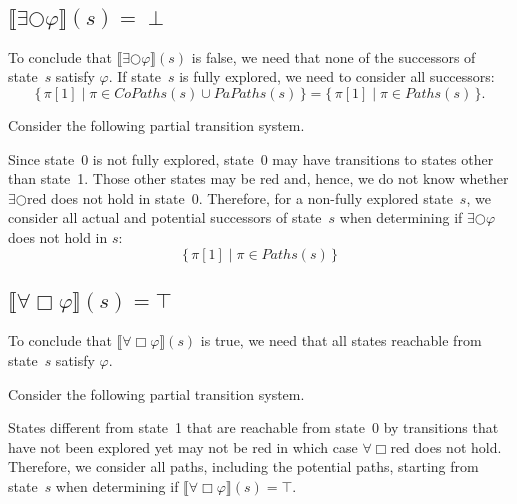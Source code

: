 \documentclass[12pt]{article}
\newcommand{\always}{\Box}
\newcommand{\nxt}{\bigcirc}
\theoremstyle{definition}
\newcommand{\satisfaction}[1]{\llbracket #1 \rrbracket}
\newenvironment{franck}{\color{red}}{\color{black}}
\begin{document}
\begin{franck}
\subsection*{$\satisfaction{\exists \nxt \varphi}(s) = \perp$}

To conclude that $\satisfaction{\exists \nxt \varphi}(s)$ is false, we need that none of the successors of state~$s$ satisfy $\varphi$.  If state~$s$ is fully explored, we need to consider all successors:
\[
\{\, \pi[1] \mid \pi \in \mathit{CoPaths}(s) \cup \mathit{PaPaths}(s) \,\}
= \{\, \pi[1] \mid \pi \in \mathit{Paths}(s) \,\}.
\]

Consider the following partial transition system.
\begin{center}
\end{center}
Since state~0 is not fully explored, state~0 may have transitions to states other than state~1.  Those other states may be red and, hence, we do not know whether  $\exists \nxt \mbox{red}$ does not hold in state~0.  Therefore, for a non-fully explored state~$s$, we consider all actual and potential successors of state~$s$ when determining if $\exists \nxt \varphi$ does not hold in $s$:
\[
\{\, \pi[1] \mid \pi \in \mathit{Paths}(s) \,\}
\]

\subsection*{$\satisfaction{\forall \always \varphi}(s) = \top$}

To conclude that $\satisfaction{\forall \always \varphi}(s)$ is true, we need that all states reachable from state~$s$ satisfy $\varphi$.

Consider the following partial transition system.
\begin{center}
\end{center}
States different from state~1 that are reachable from state~0 by transitions that have not been explored yet may not be red in which case $\forall \always \mbox{red}$ does not hold.  Therefore, we consider all paths, including the potential paths, starting from state~$s$ when determining if $\satisfaction{\forall \always \varphi}(s) = \top$.


\end{franck}
\end{document}
